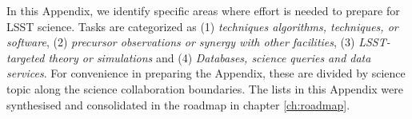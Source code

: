 In this Appendix, we identify specific areas where effort is needed to 
prepare for LSST science. 
Tasks are categorized
as (1) {\it techniques algorithms, techniques, or software}, (2) {\it
precursor observations or synergy with other facilities}, (3) 
{\it LSST-targeted theory or simulations} and (4) {\it Databases, science queries and data services}. 
For convenience in preparing the Appendix, these are divided by science
topic along the science collaboration boundaries. 
The lists in this Appendix were synthesised and consolidated in the roadmap in chapter \ref{ch:roadmap}. 

